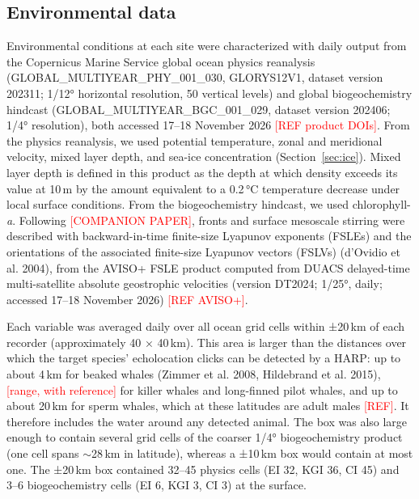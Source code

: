 \documentclass[11pt]{article}
\newcommand{\ins}[1]{\textcolor{red}{[#1]}}
\newcommand{\chla}{chlorophyll-\textit{a}}
\newcommand{\unit}[1]{\,#1}
\begin{document}
\subsection{Environmental data}\label{sec:env}
Environmental conditions at each site were characterized with daily output from the Copernicus Marine Service global ocean physics reanalysis (GLOBAL\_MULTIYEAR\_PHY\_001\_030, GLORYS12V1, dataset version 202311; 1/12° horizontal resolution, 50 vertical levels) and global biogeochemistry hindcast (GLOBAL\_MULTIYEAR\_BGC\_001\_029, dataset version 202406; 1/4° resolution), both accessed 17--18 November 2026 \ins{REF product DOIs}. From the physics reanalysis, we used potential temperature, zonal and meridional velocity, mixed layer depth, and sea-ice concentration (Section~\ref{sec:ice}). Mixed layer depth is defined in this product as the depth at which density exceeds its value at 10\unit{m} by the amount equivalent to a 0.2\unit{°C} temperature decrease under local surface conditions. From the biogeochemistry hindcast, we used \chla. Following \ins{COMPANION PAPER}, fronts and surface mesoscale stirring were described with backward-in-time finite-size Lyapunov exponents (FSLEs) and the orientations of the associated finite-size Lyapunov vectors (FSLVs) (d'Ovidio et al. 2004), from the AVISO+ FSLE product computed from DUACS delayed-time multi-satellite absolute geostrophic velocities (version DT2024; 1/25°, daily; accessed 17--18 November 2026) \ins{REF AVISO+}.

Each variable was averaged daily over all ocean grid cells within ±20\unit{km} of each recorder (approximately 40 × 40\unit{km}). This area is larger than the distances over which the target species' echolocation clicks can be detected by a HARP: up to about 4\unit{km} for beaked whales (Zimmer et al. 2008, Hildebrand et al. 2015), \ins{range, with reference} for killer whales and long-finned pilot whales, and up to about 20\unit{km} for sperm whales, which at these latitudes are adult males \ins{REF}. It therefore includes the water around any detected animal. The box was also large enough to contain several grid cells of the coarser 1/4° biogeochemistry product (one cell spans $\sim$28\unit{km} in latitude), whereas a ±10\unit{km} box would contain at most one. The ±20\unit{km} box contained 32--45 physics cells (EI 32, KGI 36, CI 45) and 3--6 biogeochemistry cells (EI 6, KGI 3, CI 3) at the surface.
\end{document}

